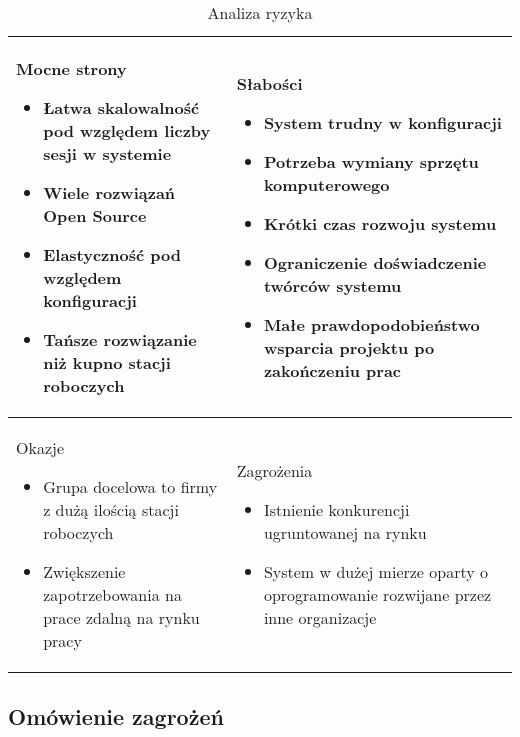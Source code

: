 \documentclass[../wstep.tex]{subfiles}
\begin{document}
\begin{table}[H]
    \caption[Opis skrócony]{Analiza ryzyka}
    \label{risk-analysis}
    \centering
    \begin{tabular}{| p{} | p{} |}
        \hline
        Mocne strony
        \begin{itemize}
            \item Łatwa skalowalność pod względem liczby sesji w systemie
            \item Wiele rozwiązań Open Source
            \item Elastyczność pod względem konfiguracji
            \item Tańsze rozwiązanie niż kupno stacji roboczych
        \end{itemize}
         &
        Słabości
        \begin{itemize}
            \item System trudny w konfiguracji
            \item Potrzeba wymiany sprzętu komputerowego
            \item Krótki czas rozwoju systemu
            \item Ograniczenie doświadczenie twórców systemu
            \item Małe prawdopodobieństwo wsparcia projektu po zakończeniu prac
        \end{itemize}
        \\ \hline

        Okazje
        \begin{itemize}
            \item Grupa docelowa to firmy z dużą ilością stacji roboczych
            \item Zwiększenie zapotrzebowania na prace zdalną na rynku pracy
        \end{itemize}
         &

        Zagrożenia
        \begin{itemize}
            \item Istnienie konkurencji ugruntowanej na rynku
            \item System w dużej mierze oparty o oprogramowanie rozwijane przez inne organizacje
        \end{itemize}
        \\ \hline
    \end{tabular}
\end{table}

\subsection{Omówienie zagrożeń}
\end{document}
